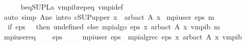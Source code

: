 \begin{isabellebody}
\ \ \ \ \isamarkupfalse%
\ {\isasymL}\isactrlsub b{\isacharunderscore}{\kern0pt}eq{\isacharunderscore}{\kern0pt}SUP{\isacharunderscore}{\kern0pt}L\isactrlsub a\ v{}{\isacharunderscore}{\kern0pt}mpi\isactrlsub b{\isachardot}{\kern0pt}rep{\isacharunderscore}{\kern0pt}eq\ v{}{\isacharunderscore}{\kern0pt}mpi{\isacharunderscore}{\kern0pt}def\isanewline
\ \ \ \ \isamarkupfalse%
\ {\isacharparenleft}{\kern0pt}auto\ simp{\isacharcolon}{\kern0pt}\ A{\isacharunderscore}{\kern0pt}ne\ intro{\isacharcolon}{\kern0pt}\ cSUP{\isacharunderscore}{\kern0pt}upper{}{\isacharbrackleft}{\kern0pt}\ x\ {\isacharequal}{\kern0pt}\ {\isachardoublequoteopen}arb{\isacharunderscore}{\kern0pt}act\ {\isacharparenleft}{\kern0pt}A\ x{\isacharparenright}{\kern0pt}{\isachardoublequoteclose}{\isacharbrackright}{\kern0pt}{\isacharparenright}{\kern0pt}\isanewline
{}\isamarkupfalse%
%
\endisatagproof
{\isafoldproof}%
%
\isadelimproof
%
\endisadelimproof
%
\isadelimdocument
%
\endisadelimdocument
%
\isatagdocument
%
\isamarkuptrue%
%
\endisatagdocument
{\isafolddocument}%
%
\isadelimdocument
%
\endisadelimdocument
{}\isamarkupfalse%
\ {\isachardoublequoteopen}mpi{\isacharunderscore}{\kern0pt}user\ eps\ m\ {\isacharequal}{\kern0pt}\ {\isacharparenleft}{\kern0pt}\isanewline
\ \ if\ eps\ {\isasymle}\ {}\ then\ undefined\ else\ mpi{\isacharunderscore}{\kern0pt}algo\ eps\ {\isacharparenleft}{\kern0pt}{\isasymlambda}x{\isachardot}{\kern0pt}\ arb{\isacharunderscore}{\kern0pt}act\ {\isacharparenleft}{\kern0pt}A\ x{\isacharparenright}{\kern0pt}{\isacharparenright}{\kern0pt}\ v{}{\isacharunderscore}{\kern0pt}mpi\isactrlsub b\ m{\isacharparenright}{\kern0pt}{\isachardoublequoteclose}\isanewline
\isanewline
{}\isamarkupfalse%
\ mpi{\isacharunderscore}{\kern0pt}user{\isacharunderscore}{\kern0pt}eq{\isacharcolon}{\kern0pt}\ \isanewline
\ \ \ {\isachardoublequoteopen}eps\ {\isachargreater}{\kern0pt}\ {}{\isachardoublequoteclose}\isanewline
\ \ \ {\isachardoublequoteopen}mpi{\isacharunderscore}{\kern0pt}user\ eps\ {\isacharequal}{\kern0pt}\ mpi{\isacharunderscore}{\kern0pt}alg{\isacharunderscore}{\kern0pt}rec\ eps\ {\isacharparenleft}{\kern0pt}{\isasymlambda}x{\isachardot}{\kern0pt}\ arb{\isacharunderscore}{\kern0pt}act\ {\isacharparenleft}{\kern0pt}A\ x{\isacharparenright}{\kern0pt}{\isacharparenright}{\kern0pt}\ v{}{\isacharunderscore}{\kern0pt}mpi\isactrlsub b{\isachardoublequoteclose}\isanewline

\end{isabellebody}
